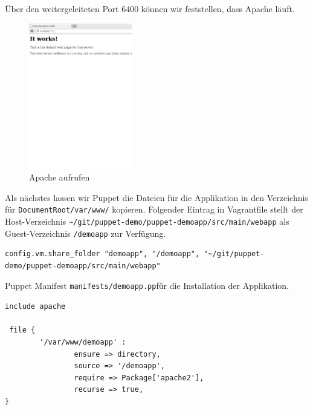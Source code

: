 \documentclass[12pt,a4paper,ngerman]{article}
\begin{document}
Über den weitergeleiteten Port 6400 können wir feststellen, dass Apache läuft.
\begin{figure}
  \begin{center}
    \includegraphics[width=0.4\textwidth]{images/apache.pdf}
  \end{center}
  \caption{Apache aufrufen}
  \label{apache}
\end{figure}

Als nächstes lassen wir Puppet die Dateien für die Applikation in den Verzeichnis für \lstinline$DocumentRoot/var/www/$ kopieren. Folgender Eintrag in Vagrantfile stellt der Host-Verzeichnis \lstinline$~/git/puppet-demo/puppet-demoapp/src/main/webapp$ als Guest-Verzeichnis \lstinline$/demoapp$ zur Verfügung.
\begin{lstlisting}[language=vagrant,caption=Shared folders in Vagrantfile konfigurieren, label=vagrantsharedfolder]
config.vm.share_folder "demoapp", "/demoapp", "~/git/puppet-demo/puppet-demoapp/src/main/webapp"
\end{lstlisting}

Puppet Manifest \lstinline$manifests/demoapp.pp$für die Installation der Applikation.
\begin{lstlisting}[language=puppet,caption=Puppet Manifest für die Applikation, label=puppetdemoapp]
include apache

 file {
        '/var/www/demoapp' :
                ensure => directory,
                source => '/demoapp',
                require => Package['apache2'],
                recurse => true,
}
\end{lstlisting}
\end{document}
